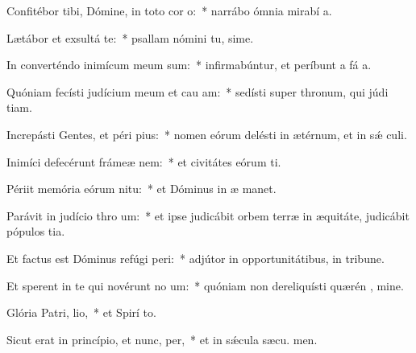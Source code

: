 \item Confitébor tibi, Dómine, in toto cor o:~* narrábo ómnia mirabí a.
\item Lætábor et exsultá  te:~* psallam nómini tu, sime.
\item In converténdo inimícum meum sum:~* infirmabúntur, et períbunt a fá a.
\item Quóniam fecísti judícium meum et cau am:~* sedísti super thronum, qui júdi tiam.
\item Increpásti Gentes, et péri pius:~* nomen eórum delésti in ætérnum, et in sǽ culi.
\item Inimíci defecérunt frámeæ  nem:~* et civitátes eórum ti.
\item Périit memória eórum  nitu:~* et Dóminus in æ manet.
\item Parávit in judício thro um:~* et ipse judicábit orbem terræ in æquitáte, judicábit pópulos  tia.
\item Et factus est Dóminus refúgi peri:~* adjútor in opportunitátibus, in tribune.
\item Et sperent in te qui novérunt no um:~* quóniam non dereliquísti quærén , mine.
\item Glória Patri,  lio,~* et Spirí to.
\item Sicut erat in princípio, et nunc,  per,~* et in sǽcula sæcu. men.
